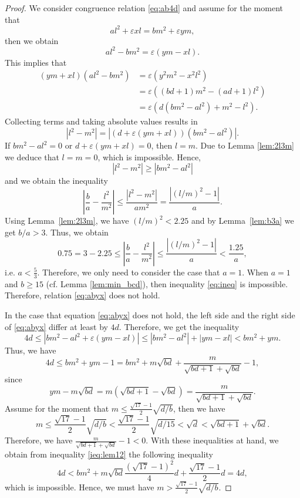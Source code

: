 \documentclass{amsart}
\theoremstyle{definition}
\begin{document}
\begin{proof}
We consider congruence relation \eqref{eq:ab4d} and assume for the moment that 
\begin{equation}\label{eq:abyx}
al^2 + \varepsilon xl = bm^2 +\varepsilon ym,
\end{equation}
then we obtain
$$
al^2-bm^2 = \varepsilon (ym-xl).
$$
This implies that 
\begin{align*}
(ym+xl)\left(al^2-bm^2\right) &=\varepsilon\left(y^2m^2 - x^2l^2\right)\\
& = \varepsilon\left((bd+1)m^2 - (ad+1)l^2\right)\\
 & = \varepsilon\left(d(bm^2 - al^2) + m^2 -l^2\right).
\end{align*}
Collecting terms and taking absolute values results in
$$
\left|l^2 - m^2\right| = \left|(d+\varepsilon(ym+xl))(bm^2 - al^2)\right|.
$$
If $bm^2 - al^2 =0$ or $d+\varepsilon(ym+xl)=0$, then $l=m$. Due to Lemma \ref{lem:2l3m} we deduce that $l=m=0$, which is impossible. Hence,
$$
\left|l^2-m^2\right| \ge \left|bm^2 - al^2\right|
$$
and we obtain the inequality
$$
\left|\frac{b}{a} - \frac{l^2}{m^2}\right| \le \frac{\left|l^2 - m^2\right|}{am^2} = \frac{\left|(l/m)^2-1\right|}{a}.
$$
Using Lemma~\ref{lem:2l3m}, we have $(l/m)^2<2.25$ and by Lemma~\ref{lem:b3a} we get $b/a>3$. Thus, we obtain
\begin{equation}\label{eq:ineq}
0.75=3-2.25\le \left|\frac{b}{a} - \frac{l^2}{m^2}\right| \le \frac{|(l/m)^2-1|}{a}<\frac{1.25}{a},
\end{equation}
i.e. $a<\frac{5}{3}$. Therefore, we only need to consider the case that $a=1$. When $a=1$ and $b\geq 15$ (cf. Lemma \ref{lem:min_bcd}), then inequality \eqref{eq:ineq} 
is impossible. Therefore, relation \eqref{eq:abyx} does not hold. 

In the case that equation \eqref{eq:abyx} does not hold, the left side and the right side of \eqref{eq:abyx} differ at least by $4d$. Therefore, we get the inequality
$$4d\leq |bm^2-al^2+\varepsilon (ym-xl)| \leq |bm^2-al^2| + |ym-xl| < bm^2 +ym. $$
Thus,  we have 
\begin{equation}\label{ieq:lem12}
4d\le bm^2 +ym-1 =bm^2 + m\sqrt{bd} +\frac{m}{\sqrt{bd+1}+\sqrt{bd}}-1,
\end{equation}
since
$$ym-m\sqrt{bd}  = m(\sqrt{bd+1}-\sqrt{bd})  = \frac{m}{\sqrt{bd+1}+\sqrt{bd}}. $$
Assume for the moment that $m\le\frac{\sqrt{17}-1}{2}\sqrt{d/b}$, then we have
$$
m\le\frac{\sqrt{17}-1}{2}\sqrt{d/b}<\frac{\sqrt{17}-1}{2}\sqrt{d/15}<\sqrt{d}<\sqrt{bd+1}+\sqrt{bd}. 
$$
Therefore, we have $\frac{m}{\sqrt{bd+1}+\sqrt{bd}}-1<0$. With these inequalities at hand,
we obtain from inequality \eqref{ieq:lem12} the following inequality
$$
4d<bm^2+m\sqrt{bd}\frac{(\sqrt{17}-1)^2}{4}d + \frac{\sqrt{17}-1}{2}d =4d,
$$
which is impossible. Hence, we must have $m> \frac{\sqrt{17}-1}{2} \sqrt{d/b}$. 
\end{proof}
\end{document}
